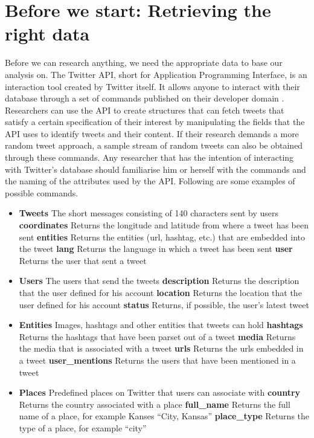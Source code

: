 \documentclass{article}
\begin{document}
\section{Before we start: Retrieving the right data}

Before we can research anything, we need the appropriate data to base our analysis on. The Twitter API, short for Application Programming Interface, is an
interaction tool created by Twitter itself. It allows anyone to interact with their database through a set of commands published on their developer domain \cite{TwitterDev}.
Researchers can use the API to create structures that can fetch tweets that satisfy a certain specification of their interest by manipulating the fields that
the API uses to identify tweets and their content. If their research demands a more random tweet approach, a sample stream of random tweets can also be 
obtained through these commands. Any researcher that has the intention of interacting with Twitter's database should familiarise him or herself with the 
commands and the naming of the attributes used by the API. Following are some examples of possible commands.

\begin{itemize}
\item \textbf{Tweets} The short messages consisting of 140 characters sent by users
	\subitem \textbf{coordinates} Returns the longitude and latitude from where a tweet has been sent
	\subitem \textbf{entities} Returns the entities (url, hashtag, etc.) that are embedded into the tweet
	\subitem \textbf{lang} Returns the language in which a tweet has been sent
	\subitem \textbf{user} Returns the user that sent a tweet
\item \textbf{Users} The users that send the tweets
	\subitem \textbf{description} Returns the description that the user defined for his account
	\subitem \textbf{location} Returns the location that the user defined for his account
	\subitem \textbf{status} Returns, if possible, the user's latest tweet
\item \textbf{Entities} Images, hashtags and other entities that tweets can hold
	\subitem \textbf{hashtags} Returns the hashtags that have been parset out of a tweet
	\subitem \textbf{media} Returns the media that is associated with a tweet
	\subitem \textbf{urls} Returns the urls embedded in a tweet
	\subitem \textbf{user\_mentions} Returns the users that have been mentioned in a tweet
\item \textbf{Places} Predefined places on Twitter that users can associate with
	\subitem \textbf{country} Returns the country associated with a place
	\subitem \textbf{full\_name} Returns the full name of a place, for example Kanses ``City, Kansas''
	\subitem \textbf{place\_type} Returns the type of a place, for example ``city''
\end{itemize}
\end{document}
